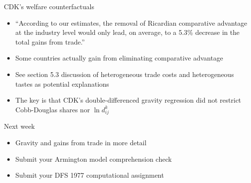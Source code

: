 \documentclass[10pt,notes=hide]{beamer}
\begin{document}
\begin{frame}{CDK's welfare counterfactuals}
\begin{itemize}
	\item ``According to our estimates, the removal of Ricardian comparative advantage at the industry level would only lead, on average, to a 5.3\% decrease in the total gains from trade.''
	\item Some countries actually gain from eliminating comparative advantage
	\item See section 5.3 discussion of heterogeneous trade costs and heterogeneous tastes as potential explanations
	\item The key is that CDK's double-differenced gravity regression did not restrict Cobb-Douglas shares nor $\ln d_{ij}^k$
\end{itemize}
\end{frame}
\begin{frame}{Next week}
\begin{itemize}
	\item Gravity and gains from trade in more detail
	\item Submit your Armington model comprehension check
	\item Submit your DFS 1977 computational assignment
\end{itemize}
\end{frame}
\end{document}
